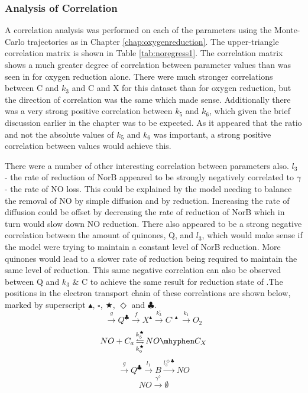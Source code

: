 \subsubsection{Analysis of Correlation}
A correlation analysis was performed on each of the parameters using the Monte-Carlo trajectories as in Chapter \ref{chap:oxygenreduction}. The upper-triangle correlation matrix is shown in Table \ref{tab:noregress1}. The correlation matrix shows a much greater degree of correlation between parameter values than was seen in for oxygen reduction alone. There were much stronger correlations between C and $k_3$ and C and X for this dataset than for oxygen reduction, but the direction of correlation was the same which made sense. Additionally there was a very strong positive correlation between $k_5$ and $k_6$, which given the brief discussion earlier in the chapter was to be expected. As it appeared that the ratio and not the absolute values of $k_5$ and $k_6$ was important, a strong positive correlation between values would achieve this.

There were a number of other interesting correlation between parameters also. $l_3$ - the rate of reduction of NorB appeared to be strongly negatively correlated to $\gamma$- the rate of NO loss. This could be explained by the model needing to balance the removal of NO by simple diffusion and by reduction. Increasing the rate of diffusion could be offset by decreasing the rate of reduction of NorB which in turn would slow down NO reduction. There also appeared to be a strong negative correlation between the amount of quinones, Q, and $l_3$, which would make sense if the model were trying to maintain a constant level of NorB reduction. More quinones would lead to a slower rate of reduction being required to maintain the same level of reduction. This same negative correlation can also be observed between Q and $k_3$ \& C to achieve the same result for reduction state of \cbbthree{}.The positions in the electron transport chain of these correlations are shown below, marked by superscript $\blacktriangle$, $\square$, $\bigstar$, $\Diamond$ and $\clubsuit$.
\begin{equation*}
\xrightarrow{g}Q^\clubsuit\xrightarrow{f}X^{\blacktriangle}\xrightarrow{k_3^{\square}}C^{\square\blacktriangle}\xrightarrow{k_1}O_2
\end{equation*}
\begin{equation*}
NO + C_a \mathop{\leftrightharpoons}_{k_6^{\bigstar}}^{k_5^{\bigstar}}NO\mhyphen C_X
\end{equation*}
\begin{equation*}
\xrightarrow{g}Q^\clubsuit\xrightarrow{l_1}B\xrightarrow{l_3^{\Diamond\clubsuit}} NO
\end{equation*}
\begin{equation*}
NO\xrightarrow{\gamma^\lozenge}\emptyset
\end{equation*}



